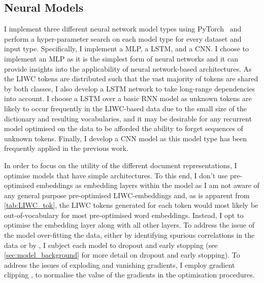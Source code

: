 \subsection{Neural Models}\label{sec:redux_neural}
I implement three different neural network model types using PyTorch~\citep{Paszke:2019} and perform a hyper-parameter search on each model type for every dataset and input type.
Specifically, I implement a MLP, a LSTM, and a CNN.
I choose to implement an MLP as it is the simplest form of neural networks and it can provide insights into the applicability of neural network-based architectures.
As the LIWC tokens are distributed such that the vast majority of tokens are shared by both classes, I also develop a LSTM network to take long-range dependencies into account.
I choose a LSTM over a basic RNN model as unknown tokens are likely to occur frequently in the LIWC-based data due to the small size of the dictionary and resulting vocabularies, and it may be desirable for any recurrent model optimised on the data to be afforded the ability to forget sequences of unknown tokens.
Finally, I develop a CNN model as this model type has been frequently applied in the previous work.

In order to focus on the utility of the different document representations, I optimise models that have simple architectures.
To this end, I  don't use pre-optimised embeddings as embedding layers within the model as I am not aware of any general purpose pre-optimised LIWC-embeddings and, as is apparent from \cref{tab:LIWC_tok}, the LIWC tokens generated for each token would most likely be out-of-vocabulary for most pre-optimised word embeddings.
Instead, I opt to optimise the embedding layer along with all other layers.
To address the issue of the model over-fitting the data, either by identifying spurious correlations in the data or by , I subject each model to dropout and early stopping (see \cref{sec:model_background} for more detail on dropout and early stopping).
To address the issues of exploding and vanishing gradients, I employ gradient clipping \citep{Bengio:1994}, to normalise the value of the gradients in the optimisation procedures.

